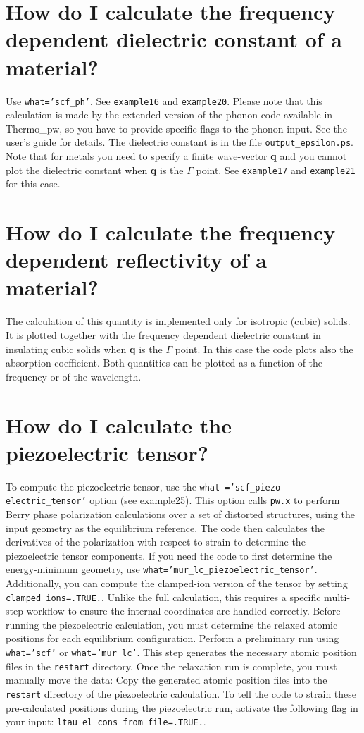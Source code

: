 \documentclass[12pt,a4paper,twoside]{report}
\def\thermo{{\sc Thermo}\_{\sc pw}}
\begin{document}
\newpage
{\color{coral}\section{How do I calculate the frequency dependent dielectric
constant of a material?}}
\color{black}
Use \texttt{what='scf\_ph'}. See \texttt{example16} and \texttt{example20}. 
Please note that this calculation is made by the extended version of the
phonon code available in \thermo, so you have to provide specific flags
to the phonon input. See the user's guide for details. 
The dielectric constant is in the file \texttt{output\_epsilon.ps}.
Note that for metals you need to specify a finite wave-vector {\bf q} and you 
cannot plot the dielectric constant when {\bf q} is the $\Gamma$ point.  
See \texttt{example17} and \texttt{example21} for this case. 

\newpage
{\color{coral}\section{How do I calculate the frequency dependent 
reflectivity of a material?}}
\color{black}
The calculation of this quantity is implemented only for isotropic 
(cubic) solids. It is plotted together with the frequency dependent 
dielectric constant in insulating cubic solids when {\bf q} is 
the $\Gamma$ point. In this case the code plots also the 
absorption coefficient. Both quantities can be plotted as a function of
the frequency or of the wavelength.

\newpage

{\color{coral}\section{How do I calculate the piezoelectric tensor?}}
\color{black}
To compute the piezoelectric tensor, use the 
\texttt{what ='scf\_piezo-} \texttt{electric\_tensor'} option 
(see example25). This option
calls \texttt{pw.x} to perform Berry phase polarization calculations 
over a set of distorted structures, using the input geometry as 
the equilibrium reference. The code then calculates the derivatives 
of the polarization with respect to strain to determine the 
piezoelectric tensor components. If you need the code to first determine 
the energy-minimum geometry, use 
\texttt{what='mur\_lc\_piezoelectric\_tensor'}.
Additionally, you can 
compute the clamped-ion version of the tensor by setting 
\texttt{clamped\_ions=.TRUE.}. 
Unlike the full calculation, this requires a specific multi-step workflow 
to ensure the internal coordinates are handled correctly.
Before running the piezoelectric calculation, you must determine 
the relaxed atomic positions for each equilibrium configuration.
Perform a preliminary run using \texttt{what='scf'} or 
\texttt{what='mur\_lc'}.
This step generates the necessary atomic position files in the
\texttt{restart} directory.
Once the relaxation run is complete, you must manually move the data:
Copy the generated atomic position files into the \texttt{restart} 
directory of the piezoelectric calculation.
To tell the code to strain these pre-calculated positions during 
the piezoelectric run, activate the following flag in your input:
\texttt{ltau\_el\_cons\_from\_file=.TRUE.}.
\end{document}
